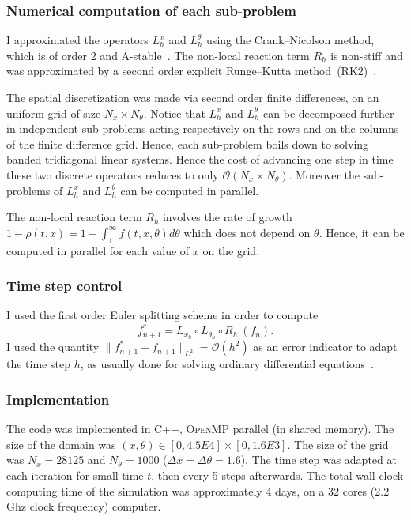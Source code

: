 \documentclass[10pt]{amsart}
\theoremstyle{definition}\newtheorem{defi}[theo]{Definition}\newtheorem{rema}[theo]{Remark}\newtheorem{exam}[theo]{Example}\newtheorem{exem}[theo]{Example}\newtheorem{nota}[theo]{Notation}
\newcommand{\mO}{\mathcal{O}}
\newcommand{\1}{\mathds{1}}
\begin{document}
\subsubsection{Numerical computation of each sub-problem} 
I approximated the operators $L^x_{h}$ and $L^\theta_{h}$ using the Crank--Nicolson method, which is of order 2 and A-stable~\cite{MR1439506}. The non-local reaction term $R_{h}$ is non-stiff and was approximated by a second order explicit Runge--Kutta method~(RK2)~\cite{hairer1993solving}.

The spatial discretization was made via second order finite differences, on an uniform grid of size $N_x \times N_\theta$. Notice that $L^x_{h}$ and $L^\theta_{h}$ can be decomposed further in independent sub-problems acting respectively on the rows and on the columns of the finite difference grid. Hence, each sub-problem boils down to solving banded tridiagonal linear systems. Hence the cost of advancing one step in time these two discrete operators reduces to only $\mO (N_x \times N_\theta)$. Moreover the sub-problems of $L^x_{h}$ and $L^\theta_{h}$ can be computed in parallel.

The non-local reaction term $R_{h}$ involves the rate of growth $1 - \rho(t,x) = 1- \int_1^\infty f(t,x,\theta) d\theta$ which does not depend on $\theta$. Hence, it can be computed in parallel for each value of $x$ on the grid.

\subsubsection{Time step control}
I used the first order Euler splitting scheme in order to compute
\[
f^*_{n+1}= L_{x_{h}} \circ L_{\theta_h} \circ R_{h}\ (f_{n}).
\]
I used the quantity $\|f^*_{n+1}-f_{n+1}\|_{L^2} = \mO(h^2)$ as an error indicator to adapt the time step $h$, as usually done for solving ordinary differential equations~\cite{hairer1993solving}.

\subsubsection{Implementation}
The code was implemented in \textsc{C++}, \textsc{OpenMP} parallel (in shared memory). The size of the domain was $(x,\theta)\in [0, 4.5E4]\times[0,1.6E3]$. The size of the grid was $N_x = 28125$ and $N_\theta = 1000$ ($\Delta x = \Delta\theta = 1.6$). The time step was adapted at each iteration for small time $t$, then every 5 steps afterwards. The total wall clock computing time of the simulation was approximately 4 days, on a 32 cores (2.2 Ghz clock frequency) computer.
\end{document}
